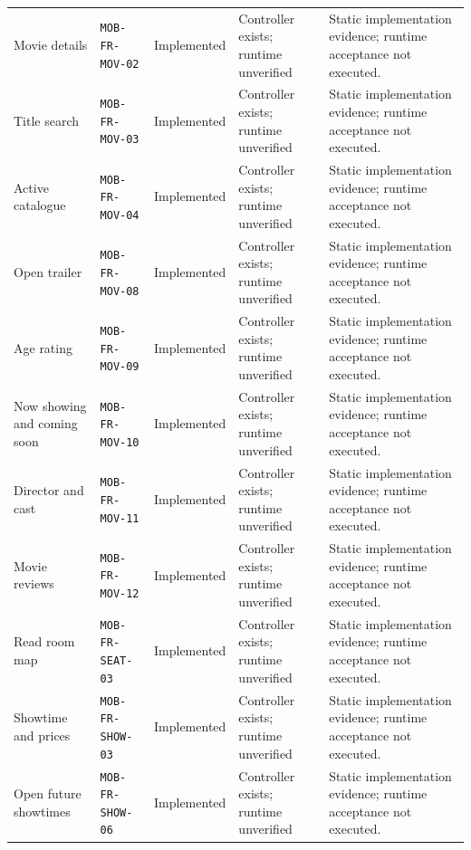 \begin{longtable}{@{}P{0.19000\SRSWidth}P{0.18000\SRSWidth}P{0.15000\SRSWidth}P{0.20000\SRSWidth}P{0.28000\SRSWidth}@{}}
Movie details & \texttt{MOB-\allowbreak{}FR-\allowbreak{}MOV-\allowbreak{}02} & Implemented & Controller exists; runtime unverified & Static implementation evidence; runtime acceptance not executed. \\[3pt]
Title search & \texttt{MOB-\allowbreak{}FR-\allowbreak{}MOV-\allowbreak{}03} & Implemented & Controller exists; runtime unverified & Static implementation evidence; runtime acceptance not executed. \\[3pt]
Active catalogue & \texttt{MOB-\allowbreak{}FR-\allowbreak{}MOV-\allowbreak{}04} & Implemented & Controller exists; runtime unverified & Static implementation evidence; runtime acceptance not executed. \\[3pt]
Open trailer & \texttt{MOB-\allowbreak{}FR-\allowbreak{}MOV-\allowbreak{}08} & Implemented & Controller exists; runtime unverified & Static implementation evidence; runtime acceptance not executed. \\[3pt]
Age rating & \texttt{MOB-\allowbreak{}FR-\allowbreak{}MOV-\allowbreak{}09} & Implemented & Controller exists; runtime unverified & Static implementation evidence; runtime acceptance not executed. \\[3pt]
Now showing and coming soon & \texttt{MOB-\allowbreak{}FR-\allowbreak{}MOV-\allowbreak{}10} & Implemented & Controller exists; runtime unverified & Static implementation evidence; runtime acceptance not executed. \\[3pt]
Director and cast & \texttt{MOB-\allowbreak{}FR-\allowbreak{}MOV-\allowbreak{}11} & Implemented & Controller exists; runtime unverified & Static implementation evidence; runtime acceptance not executed. \\[3pt]
Movie reviews & \texttt{MOB-\allowbreak{}FR-\allowbreak{}MOV-\allowbreak{}12} & Implemented & Controller exists; runtime unverified & Static implementation evidence; runtime acceptance not executed. \\[3pt]
Read room map & \texttt{MOB-\allowbreak{}FR-\allowbreak{}SEAT-\allowbreak{}03} & Implemented & Controller exists; runtime unverified & Static implementation evidence; runtime acceptance not executed. \\[3pt]
Showtime and prices & \texttt{MOB-\allowbreak{}FR-\allowbreak{}SHOW-\allowbreak{}03} & Implemented & Controller exists; runtime unverified & Static implementation evidence; runtime acceptance not executed. \\[3pt]
Open future showtimes & \texttt{MOB-\allowbreak{}FR-\allowbreak{}SHOW-\allowbreak{}06} & Implemented & Controller exists; runtime unverified & Static implementation evidence; runtime acceptance not executed. \\[3pt]

\end{longtable}
